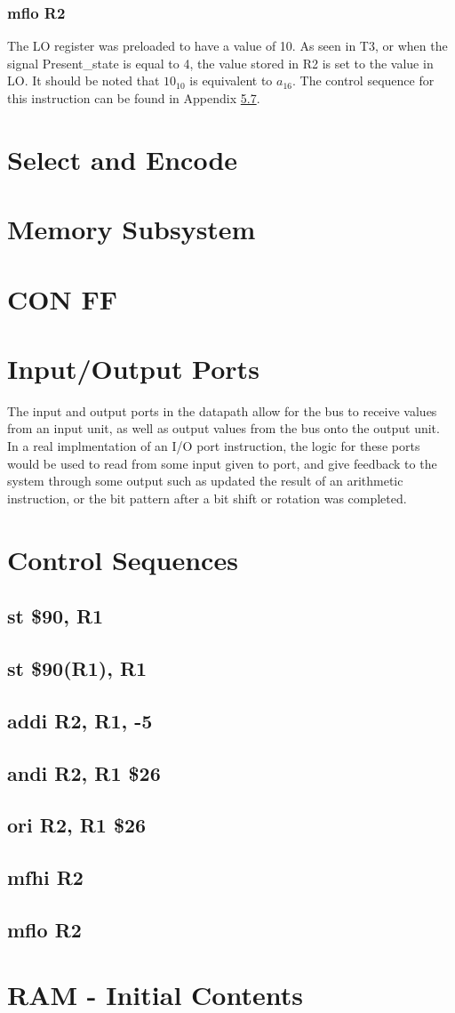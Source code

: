 \documentclass{article}
\begin{document}
            \subsubsection{mflo R2}
                The LO register was preloaded to have a value of 10. As seen in T3, or when the signal Present\_state is equal to 4, the value stored in R2 is set to the value in LO. It should be noted that $10_{10}$ is equivalent to $a_{16}$. The control sequence for this instruction can be found in Appendix \ref{mflo_sequence}.
\appendix
\section{Select and Encode}
\section{Memory Subsystem}
\section{CON FF}
\section{Input/Output Ports}
The input and output ports in the datapath allow for the bus to receive values from an input unit, as well as output values from the bus onto the output unit. In a real implmentation of an I/O port instruction, the logic for these ports would be used to read from some input given to port, and give feedback to the system through some output such as updated the result of an arithmetic instruction, or the bit pattern after a bit shift or rotation was completed.
\section{Control Sequences}
    \subsection{st \$90, R1} \label{st_case_1_sequence}
    \subsection{st \$90(R1), R1} \label{st_case_2_sequence}
    \subsection{addi R2, R1, -5} \label{addi_sequence}
    \subsection{andi R2, R1 \$26} \label{andi_sequence}
    \subsection{ori R2, R1 \$26} \label{ori_sequence}
    \subsection{mfhi R2} \label{mfhi_sequence}
    \subsection{mflo R2} \label{mflo_sequence}
\section{RAM - Initial Contents} \label{ram_init}
\end{document}
